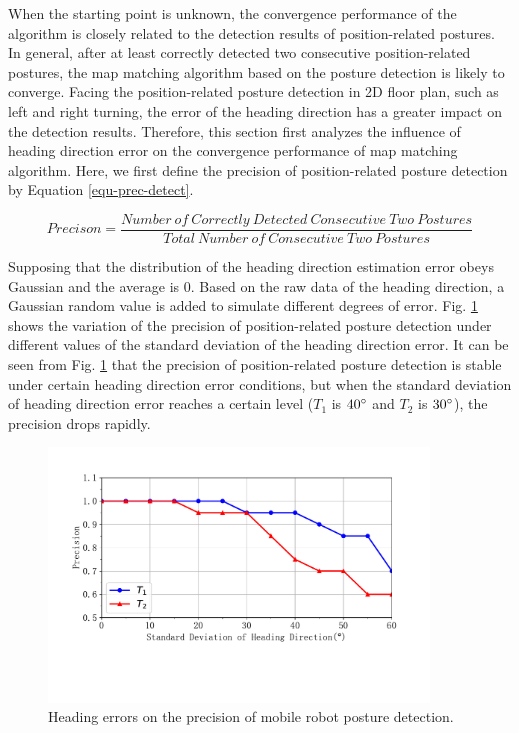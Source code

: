 \documentclass{llncs}
\begin{document}
When the starting point is unknown, the convergence performance of the algorithm is closely related to the detection results of position-related postures. In general, after at least correctly detected two consecutive position-related postures, the map matching algorithm based on the posture detection is likely to converge. Facing the position-related posture detection in 2D floor plan, such as left and right turning, the error of the heading direction has a greater impact on the detection results. Therefore, this section first analyzes the influence of heading direction error on the convergence performance of map matching algorithm. Here, we first define the precision of position-related posture detection by Equation \ref{equ-prec-detect}.

\begin{equation}
\label{equ-prec-detect}
	{Precison} = \frac{Number\ of\ Correctly\ Detected\ Consecutive\ Two\ Postures}{Total\ Number\ of\ Consecutive\ Two\ Postures}
\end{equation}

Supposing that the distribution of the heading direction estimation error obeys Gaussian and the average is $0$. Based on the raw data of the heading direction, a Gaussian random value is added to simulate different degrees of error. Fig. \ref{fig-headingerror} shows the variation of the precision of position-related posture detection under different values of the standard deviation of the heading direction error. It can be seen from Fig. \ref{fig-headingerror} that the precision of position-related posture detection is stable under certain heading direction error conditions, but when the standard deviation of heading direction error reaches a certain level ($T_1$ is $40{\rm{^\circ }}$ and $T_2$ is $30{\rm{^\circ }}$), the precision drops rapidly.

\begin{figure}[!htbp]
	\centering
	\includegraphics[width=3.976in]{RobotMatch-HeadingError}
	\caption{Heading errors on the precision of mobile robot posture detection.}
	\label{fig-headingerror}
\end{figure}
\end{document}
